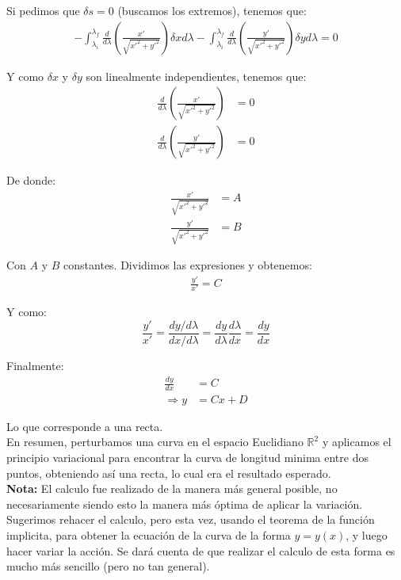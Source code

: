 \documentclass[paper=a4, fontsize=11pt,twoside]{scrartcl}
\begin{document}
Si pedimos que $\delta s = 0$ (buscamos los extremos), tenemos que:
	\begin{align*}
		- \int^{\lambda_{f}}_{\lambda_{i}}  \frac{d}{d\lambda} \left( \frac{x'}{\sqrt{ x'^{2} + y'^{2} }}  \right) \delta x d\lambda  - \int^{\lambda_{f}}_{\lambda_{i}}  \frac{d}{d\lambda} \left( \frac{y'}{\sqrt{ x'^{2} + y'^{2} }}  \right) \delta y d\lambda = 0
	\end{align*}

Y como $\delta x$ y  $\delta y$ son linealmente independientes, tenemos que:
	\begin{align*}
		\frac{d}{d\lambda} \left( \frac{x'}{\sqrt{ x'^{2} + y'^{2} }}  \right) &= 0 \\
		\frac{d}{d\lambda} \left( \frac{y'}{\sqrt{ x'^{2} + y'^{2} }}  \right) &= 0
	\end{align*}

De donde:
	\begin{align*}
		 \frac{x'}{\sqrt{ x'^{2} + y'^{2} }}  &= A \\
		 \frac{y'}{\sqrt{ x'^{2} + y'^{2} }}  &= B
	\end{align*}

Con $A$ y $B$ constantes. Dividimos las expresiones y obtenemos:
	\begin{align*}
		\frac{y'}{x'} = C
	\end{align*}

Y como:
	\begin{equation*}
		\frac{y'}{x'} = \frac{dy/d\lambda}{dx/d\lambda} = \frac{dy}{d\lambda} \frac{d\lambda}{dx} = \frac{dy}{dx}
	\end{equation*}

Finalmente:
	\begin{align*}
		\frac{dy}{dx} &= C \\
		\Rightarrow y &= Cx + D
	\end{align*}
	
Lo que corresponde a una recta. \\

En resumen, perturbamos una curva en el espacio Euclidiano $\mathbb{R}^{2}$ y aplicamos el principio variacional para encontrar la curva de 
longitud minima entre dos puntos, obteniendo as\'i una recta, lo cual era el resultado esperado. \\

\textbf{Nota:} El calculo fue realizado de la manera m\'as general posible, no necesariamente siendo esto la manera m\'as \'optima de 
aplicar la variaci\'on. Sugerimos rehacer el calculo, pero esta vez, usando el teorema de la funci\'on implicita, para obtener la ecuaci\'on 
de la curva de la forma $y=y(x)$, y luego hacer variar la acci\'on. Se dar\'a cuenta de que realizar el calculo de esta forma es mucho m\'as 
sencillo (pero no tan general). \\
\end{document}
